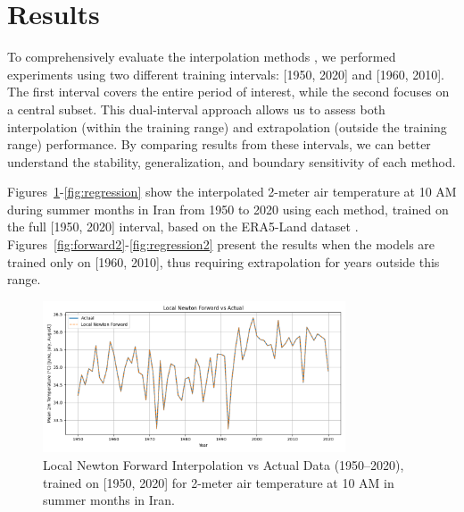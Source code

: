 \section{Results}

To comprehensively evaluate the interpolation methods \cite{atkinson1989introduction, burden2011numerical, smith2020numerical, johnson2018introduction, lee2019comparison, brown2021polynomial, garcia2022newton, press2007numerical}, we performed experiments using two different training intervals: [1950, 2020] and [1960, 2010]. The first interval covers the entire period of interest, while the second focuses on a central subset. This dual-interval approach allows us to assess both interpolation (within the training range) and extrapolation (outside the training range) performance. By comparing results from these intervals, we can better understand the stability, generalization, and boundary sensitivity of each method.

Figures~\ref{fig:forward}-\ref{fig:regression} show the interpolated 2-meter air temperature at 10 AM during summer months in Iran from 1950 to 2020 using each method, trained on the full [1950, 2020] interval, based on the ERA5-Land dataset \cite{ERA5}. Figures~\ref{fig:forward2}-\ref{fig:regression2} present the results when the models are trained only on [1960, 2010], thus requiring extrapolation for years outside this range.

\begin{figure}[htbp]
    \centering
    \includegraphics[width=0.8\textwidth]{../figs/Local_Newton_Forward_vs_actual[1950, 2020, 1].png}
    \caption{Local Newton Forward Interpolation vs Actual Data (1950--2020), trained on [1950, 2020] for 2-meter air temperature at 10 AM in summer months in Iran.}
    \label{fig:forward}
\end{figure}

